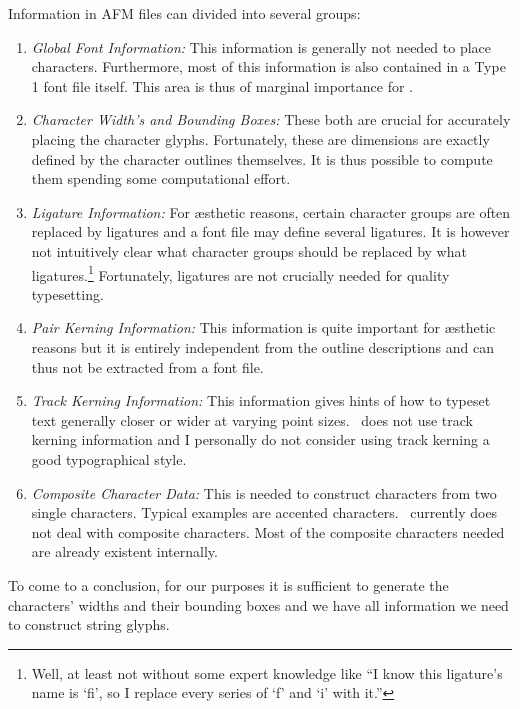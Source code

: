Information in AFM files can divided into several groups:
\begin{enumerate}
\item {\em Global Font Information:} This information is generally not needed
  to place characters. Furthermore, most of this information is also
  contained in a Type 1 font file itself. This area is thus of marginal
  importance for \tonelib. 
\item {\em Character Width's and Bounding Boxes:} These both are crucial for
  accurately placing the character glyphs. Fortunately, these are dimensions
  are exactly defined by the character outlines themselves. It is thus
  possible to compute them spending some computational effort.
\item {\em Ligature Information:} For \ae sthetic reasons, certain character
  groups are often replaced by ligatures and a font file may define several
  ligatures. It is however not intuitively clear what character groups should
  be replaced by what ligatures.\footnote{Well, at least not without some
    expert knowledge like ``I know this ligature's name is `f{}i', so I
  replace  every series of `f' and `i' with it.''}
  Fortunately, ligatures are not crucially needed for quality typesetting.
\item {\em Pair Kerning Information:} This information is quite important for
  \ae sthetic reasons but it is entirely independent from the outline
  descriptions and can thus not be extracted from a font file.
\item {\em Track Kerning Information:} This information gives hints of how to
  typeset text generally closer or wider at varying point sizes. 
  \tonelib\ does not use track kerning
  information and I personally do not consider using track kerning a good
  typographical style. 
\item {\em Composite Character Data:} This is needed to construct characters
  from two single characters. Typical examples are accented
  characters. \tonelib\ currently does not deal with composite
  characters. Most of the composite characters needed are already existent
  internally. 
\end{enumerate}
To come to a conclusion, for our purposes it is sufficient to generate the
characters' widths and their bounding boxes and we have all information we
need to construct string glyphs.

